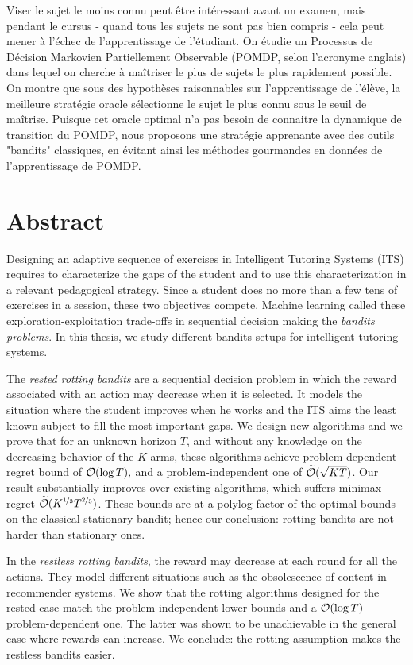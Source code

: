 Viser le sujet le moins connu peut être intéressant avant un examen, mais pendant le cursus - quand tous les sujets ne sont pas bien compris - cela peut mener à l'échec de l'apprentissage de l'étudiant. On étudie un Processus de Décision Markovien Partiellement Observable (POMDP, selon l'acronyme anglais) dans lequel on cherche à maîtriser le plus de sujets le plus rapidement possible. On montre que sous des hypothèses raisonnables sur l'apprentissage de l'élève, la meilleure stratégie oracle sélectionne le sujet le plus connu sous le seuil de maîtrise. Puisque cet oracle optimal n'a pas besoin de connaitre la dynamique de transition du POMDP, nous proposons une stratégie apprenante avec des outils "bandits" classiques, en évitant ainsi les méthodes gourmandes en données de l'apprentissage de POMDP.
\newpage

\section*{Abstract}
Designing an adaptive sequence of exercises in Intelligent Tutoring Systems (ITS) requires to characterize the gaps of the student and to use this characterization in a relevant pedagogical strategy. Since a student does no more than a few tens of exercises in a session, these two objectives compete. Machine learning called these exploration-exploitation trade-offs in sequential decision making the \emph{bandits problems}. In this thesis, we study different bandits setups for intelligent tutoring systems.%

The \emph{rested rotting bandits} are a sequential decision problem in which the reward associated with an action may decrease when it is selected. It models the situation where the student improves when he works and the ITS aims the least known subject to fill the most important gaps.  We design new algorithms and we prove that for an unknown horizon $T$, and without any knowledge on the decreasing behavior of the $K$ arms, these algorithms achieve problem-dependent regret bound of $\mathcal{O}(\log{T}),$ and a problem-independent one of $\widetilde{\mathcal{O}}(\sqrt{KT})$. Our result substantially improves over existing algorithms, which suffers minimax regret $\widetilde{\mathcal{O}}(K^{\nicefrac{1}{3}}T^{\nicefrac{2}{3}})$. These bounds are at a polylog factor of the optimal bounds on the classical stationary bandit; hence our conclusion: rotting bandits are not harder than stationary ones. 

In the \emph{restless rotting bandits}, the reward may decrease at each round for all the actions. They model different situations such as the obsolescence of content in recommender systems. We show that the rotting algorithms designed for the rested case match the problem-independent lower bounds and a $\mathcal{O}(\log{T})$ problem-dependent one. The latter was shown to be unachievable in the general case where rewards can increase. We conclude: the rotting assumption makes the restless bandits easier.

